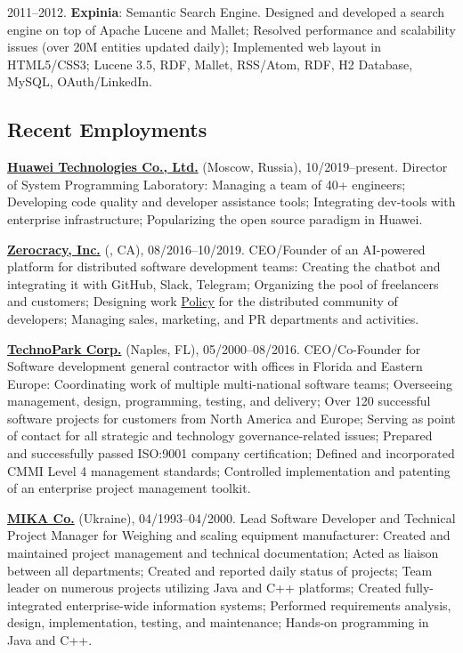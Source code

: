 \documentclass{yb}
\begin{document}
2011--2012. \textbf{Expinia}: Semantic Search Engine.
Designed and developed a search engine on top of Apache Lucene and Mallet;
Resolved performance and scalability issues (over 20M entities updated daily);
Implemented web layout in HTML5/CSS3;
Lucene 3.5, RDF, Mallet, RSS/Atom, RDF, H2 Database, MySQL, OAuth/LinkedIn.

\subsection*{Recent Employments}

\textbf{\href{https://www.huawei.com}{Huawei Technologies Co., Ltd.}} (Moscow, Russia), 10/2019--present.
Director of System Programming Laboratory:
Managing a team of 40+ engineers;
Developing code quality and developer assistance tools;
Integrating dev-tools with enterprise infrastructure;
Popularizing the open source paradigm in Huawei.

\textbf{\href{https://www.zerocracy.com}{Zerocracy, Inc.}} (, CA), 08/2016--10/2019.
CEO/Founder of an AI-powered platform for distributed software development teams:
Creating the chatbot and integrating it with GitHub, Slack, Telegram;
Organizing the pool of freelancers and customers;
Designing work \href{https://www.zerocracy.com/policy.html}{Policy} for the distributed community of developers;
Managing sales, marketing, and PR departments and activities.

\textbf{\href{https://www.technoparkcorp.com}{TechnoPark Corp.}} (Naples, FL), 05/2000--08/2016.
CEO/Co-Founder for Software development general contractor with offices in Florida and Eastern Europe:
Coordinating work of multiple multi-national software teams;
Overseeing management, design, programming, testing, and delivery;
Over 120 successful software projects for customers from North America and Europe;
Serving as point of contact for all strategic and technology governance-related issues;
Prepared and successfully passed ISO:9001 company certification;
Defined and incorporated CMMI Level 4 management standards;
Controlled implementation and patenting of an enterprise project management toolkit.

\textbf{\href{http://www.mika.ua}{MIKA Co.}} (Ukraine), 04/1993--04/2000.
Lead Software Developer and Technical Project Manager for Weighing and scaling equipment manufacturer:
Created and maintained project management and technical documentation;
Acted as liaison between all departments;
Created and reported daily status of projects;
Team leader on numerous projects utilizing Java and C++ platforms;
Created fully-integrated enterprise-wide information systems;
Performed requirements analysis, design, implementation, testing, and maintenance;
Hands-on programming in Java and C++.
\end{document}
